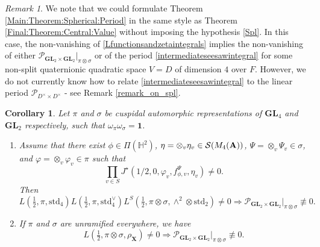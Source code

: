 \documentclass[11pt, reqno]{amsart}
\theoremstyle{plain}
\newtheorem{corollary}[theorem]{Corollary}
\theoremstyle{definition}
\theoremstyle{remark}
\newtheorem{remark}[theorem]{Remark}
\theoremstyle{plain}
\def\A{{\bf A}}
\def\GL{\mathbf{GL}}
\begin{document}
\begin{remark}\label{Main:remark:after:MTSP}
    We note that we could formulate Theorem \ref{Main:Theorem:Spherical:Period} in the same style as Theorem \ref{Final:Theorem:Central:Value} without imposing the hypothesis \eqref{Spl}. In this case, the non-vanishing of \eqref{Lfunctionsandzetaintegrals} 
    implies the non-vanishing of either $\mathcal{P}_{\GL_2 \times \GL_2}|_{\pi \otimes \sigma}$ or of the period \eqref{intermediateseesawintegral} for some non-split quaternionic quadratic space $V=D$ of dimension $4$ over $F$. However, we do not currently know how to relate \eqref{intermediateseesawintegral} to the linear period  $\mathcal{P}_{D^\times \times D^\times}$  - see Remark \ref{remark_on_spl}.
\end{remark}



\begin{corollary}\label{Main:Corollary:Spherical:1}
    Let $\pi$ and $\sigma$ be cuspidal automorphic representations of $\GL_4$ and $\GL_2$ respectively, such that $\omega_\pi  \omega_\sigma = \mathbf{1}$. \begin{enumerate}
        \item Assume that there exist $\phi \in \Pi(\mathbb{H}^2)$, $\eta = \otimes_v \eta_{v}\in \mathcal{S}(M_4(\A))$, $\Psi = \otimes_v \Psi_v \in \sigma$, and $\varphi = \otimes_v \varphi_v \in \pi$ such that
    \[\prod_{v \in S} J^\star(1/2,0,\varphi_v,f^{\Psi}_{\phi,v},\eta_v)\neq 0.\]
    Then \[L( \tfrac{1}{2},\pi,\mathrm{std}_4)L( \tfrac{1}{2},\pi,\mathrm{std}_4^{\vee})L^S(\tfrac{1}{2},\pi \otimes \sigma,\wedge^2 \otimes \mathrm{std}_2)\neq 0 \Longrightarrow {\mathcal{P}_{ \GL_2 \times \GL_2}}|_{\pi \otimes \sigma} \not \equiv 0.\]
    \item If $\pi$ and $\sigma$ are unramified everywhere, we have
    \[L( \tfrac{1}{2}, \pi \otimes \sigma, \rho_{\mathbf{X}}) \neq 0 \Longrightarrow {\mathcal{P}_{ \GL_2 \times \GL_2}}|_{\pi \otimes \sigma} \not \equiv 0.\]
    \end{enumerate} 
\end{corollary} 
     
\end{document}
